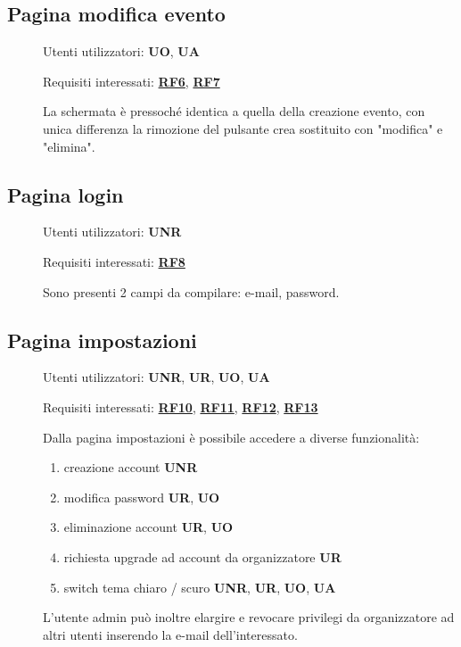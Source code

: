 \documentclass{article}
\begin{document}
\subsection{Pagina modifica evento}
\begin{description}
    \item[] Utenti utilizzatori: \textbf{UO}, \textbf{UA}
    \item[] Requisiti interessati: \hyperref[rf_6]{\textbf{RF6}}, \hyperref[rf_7]{\textbf{RF7}}
    \item[] La schermata è pressoché identica a quella della creazione evento, con unica differenza la rimozione del pulsante crea sostituito con "modifica" e "elimina".
\end{description}
\subsection{Pagina login}
\begin{description}
    \item[] Utenti utilizzatori: \textbf{UNR}
    \item[] Requisiti interessati: \hyperref[rf_8]{\textbf{RF8}}
    \item[] Sono presenti 2 campi da compilare: e-mail, password.
\end{description}
\subsection{Pagina impostazioni}
\begin{description}
    \item[] Utenti utilizzatori: \textbf{UNR}, \textbf{UR}, \textbf{UO}, \textbf{UA}
    \item[] Requisiti interessati: \hyperref[rf_10]{\textbf{RF10}}, \hyperref[rf_11]{\textbf{RF11}}, \hyperref[rf_12]{\textbf{RF12}}, \hyperref[rf_13]{\textbf{RF13}}
    \item[] Dalla pagina impostazioni è possibile accedere a diverse funzionalità:
    \begin{enumerate}
        \item creazione account \textbf{UNR}
        \item modifica password \textbf{UR}, \textbf{UO}
        \item eliminazione account \textbf{UR}, \textbf{UO}
        \item richiesta upgrade ad account da organizzatore \textbf{UR}
        \item switch tema chiaro / scuro \textbf{UNR}, \textbf{UR}, \textbf{UO}, \textbf{UA}
    \end{enumerate}
    \item[] L'utente admin può inoltre elargire e revocare privilegi da organizzatore ad altri utenti inserendo la e-mail dell'interessato.
\end{description}
\end{document}
